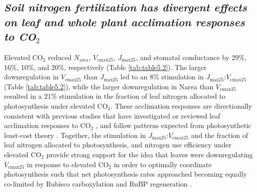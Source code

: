 \subsection{\textit{Soil nitrogen fertilization has divergent effects on leaf and whole plant acclimation responses to CO$_2$}}
Elevated CO$_2$ reduced $N_\mathrm{area}$, $V_\mathrm{cmax25}$, $J_\mathrm{max25}$, and stomatal conductance by 29\%, 16\%, 10\%, and 20\%, respectively (Table \ref{tab:table5.2}). The larger downregulation in $V_\mathrm{cmax25}$ than $J_\mathrm{max25}$ led to an 8\% stimulation in $J_\mathrm{max25}$:$V_\mathrm{cmax25}$ (Table \ref{tab:table5.2}), while the larger downregulation in Narea than $V_\mathrm{cmax25}$ resulted in a 21\% stimulation in the fraction of leaf nitrogen allocated to photosynthesis under elevated CO$_2$. These acclimation responses are directionally consistent with previous studies that have investigated or reviewed leaf acclimation responses to CO$_2$ , and follow patterns expected from photosynthetic least-cost theory . Together, the stimulation in $J_\mathrm{max25}$:$V_\mathrm{cmax25}$ and the fraction of leaf nitrogen allocated to photosynthesis, and nitrogen use efficiency under elevated CO$_2$ provide strong support for the idea that leaves were downregulating $V_\mathrm{cmax25}$ in response to elevated CO$_2$ in order to optimally coordinate photosynthesis such that net photosynthesis rates approached becoming equally co-limited by Rubisco carboxylation and RuBP regeneration .

